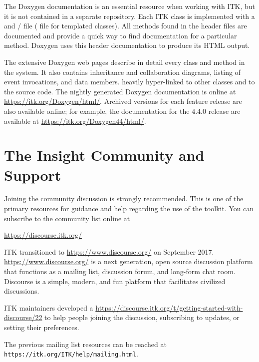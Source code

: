 The Doxygen documentation is an essential resource when working with ITK, but
it is not contained in a separate repository. Each ITK class is implemented
with a  and / file ( file for
templated classes). All methods found in the  header files are
documented and provide a quick way to find documentation for a particular
method.  Doxygen uses this header documentation to produce its HTML output.

The extensive Doxygen web pages describe in detail every class and method in
the system. It also contains inheritance and collaboration diagrams, listing
of event invocations, and data members.  heavily hyper-linked to other classes
and to the source code. The nightly generated Doxygen documentation is online at
\url{https://itk.org/Doxygen/html/}. Archived versions for each feature release
are also available online; for example, the documentation for the 4.4.0
release are available at \url{https://itk.org/Doxygen44/html/}.


\section{The Insight Community and Support}
\label{sec:AdditionalResources}
\label{sec:JoinDiscussion}


Joining the community discussion is strongly recommended. This is one of the
primary resources for guidance and help regarding the use of the toolkit. You
can subscribe to the community list online at

\begin{center}
\url{https://discourse.itk.org/}
\end{center}

ITK transitioned to \href{Discourse}{https://www.discourse.org/} on September
2017. \href{Discourse}{https://www.discourse.org/} is a next generation, open
source discussion platform that functions as a mailing list, discussion forum,
and long-form chat room. Discourse is a simple, modern, and fun platform that
facilitates civilized discussions.

ITK maintainers developed a
\href{Getting Started Guide}{https://discourse.itk.org/t/getting-started-with-discourse/22}
to help people joining the discussion, subscribing to updates, or setting their
preferences.

The previous mailing list resources can be reached at
\texttt{https://itk.org/ITK/help/mailing.html}.

